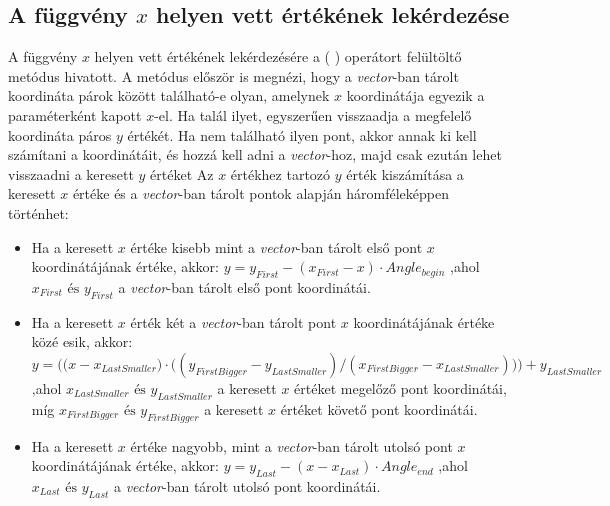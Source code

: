 \subsection{A függvény $x$ helyen vett értékének lekérdezése} \label{getValue}
A függvény $x$ helyen vett értékének lekérdezésére a ( ) operátort felültöltő metódus hivatott.
A metódus először is megnézi, hogy a \textit{vector}-ban tárolt koordináta párok között található-e olyan, amelynek $x$ koordinátája egyezik a paraméterként kapott $x$-el.
Ha talál ilyet, egyszerűen visszaadja a megfelelő koordináta páros $y$ értékét.
Ha nem található ilyen pont, akkor annak ki kell számítani a koordinátáit, és hozzá kell adni a \textit{vector}-hoz, majd csak ezután lehet visszaadni a keresett $y$ értéket
Az $x$ értékhez tartozó $y$ érték kiszámítása a keresett $x$ értéke és a \textit{vector}-ban tárolt pontok alapján háromféleképpen történhet:
\begin{itemize}
\item Ha a keresett $x$ értéke kisebb mint a \textit{vector}-ban tárolt első pont $x$ koordinátájának értéke, akkor: 
$y=y_{First}-(x_{First}-x) \cdot Angle_{begin}$ ,ahol $x_{First} \text{ és } y_{First}$ a \textit{vector}-ban tárolt első pont koordinátái.
\item Ha a keresett $x$ érték két a \textit{vector}-ban tárolt pont $x$ koordinátájának értéke közé esik, akkor:
$y=\bigg(\big(x-x_{LastSmaller}\big) \cdot \big((y_{FirstBigger}-y_{LastSmaller})/(x_{FirstBigger}-x_{LastSmaller})\big)\bigg)+y_{LastSmaller}$ ,ahol $x_{LastSmaller} \text{ és } y_{LastSmaller}$ a keresett $x$ értéket megelőző pont koordinátái, míg $x_{FirstBigger} \text{ és } y_{FirstBigger}$ a keresett $x$ értéket követő pont koordinátái. 
\item Ha a keresett $x$ értéke nagyobb, mint a \textit{vector}-ban tárolt utolsó pont $x$ koordinátájának értéke, akkor:
$y=y_{Last}-(x-x_{Last}) \cdot Angle_{end}$ ,ahol $x_{Last} \text{ és } y_{Last}$ a \textit{vector}-ban tárolt utolsó pont koordinátái.
\end{itemize}
